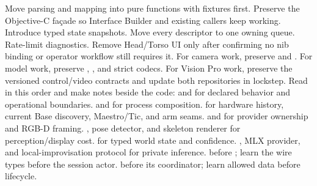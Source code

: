 {}Move parsing and mapping into pure functions with fixtures first. Preserve the Objective-C façade so Interface Builder and existing callers keep working. Introduce typed state snapshots. Move every descriptor to one owning queue. Rate-limit diagnostics. Remove Head/Torso UI only after confirming no nib binding or operator workflow still requires it.\markdownRendererParagraphSeparator
{}For camera work, preserve  and . For model work, preserve , , and strict codecs. For Vision Pro work, preserve the versioned control/video contracts and update both repositories in lockstep.\markdownRendererInterblockSeparator
{}
\markdownRendererSectionEnd \markdownRendererSectionBegin
{}\markdownRendererInterblockSeparator
{}Read in this order and make notes beside the code:\markdownRendererInterblockSeparator
{}\markdownRendererOlBegin
{} and  for declared behavior and operational boundaries.\markdownRendererOlItemEnd 
{} and  for process composition.\markdownRendererOlItemEnd 
{} for hardware history, current Base discovery, Maestro/Tic, and arm seams.\markdownRendererOlItemEnd 
{} and  for provider ownership and RGB-D framing.\markdownRendererOlItemEnd 
{}, pose detector, and skeleton renderer for perception/display cost.\markdownRendererOlItemEnd 
{} for typed world state and confidence.\markdownRendererOlItemEnd 
{}, MLX provider, and local-improvisation protocol for private inference.\markdownRendererOlItemEnd 
{} before ; learn the wire types before the session actor.\markdownRendererOlItemEnd 
{} before its coordinator; learn allowed data before lifecycle.\markdownRendererOlItemEnd 
